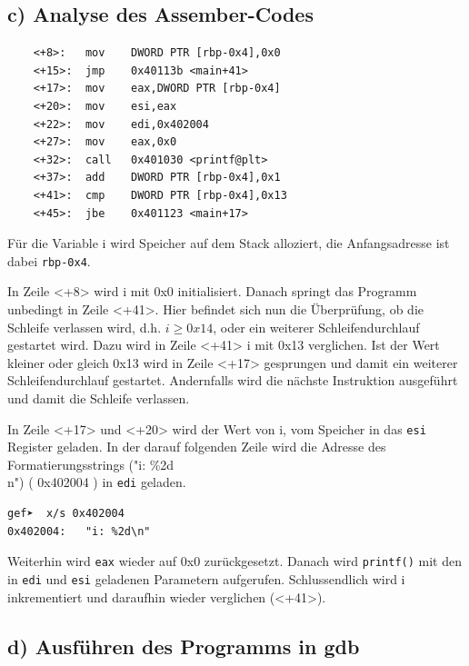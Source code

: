 \documentclass[12pt]{article}
\begin{document}
\subsection{c) Analyse des Assember-Codes}
\begin{lstlisting}
	<+8>:	mov    DWORD PTR [rbp-0x4],0x0
    <+15>:	jmp    0x40113b <main+41>
    <+17>:	mov    eax,DWORD PTR [rbp-0x4]
    <+20>:	mov    esi,eax
    <+22>:	mov    edi,0x402004
    <+27>:	mov    eax,0x0
    <+32>:	call   0x401030 <printf@plt>
    <+37>:	add    DWORD PTR [rbp-0x4],0x1
    <+41>:	cmp    DWORD PTR [rbp-0x4],0x13
    <+45>:	jbe    0x401123 <main+17>
\end{lstlisting}

Für die Variable i wird Speicher auf dem Stack alloziert, die Anfangsadresse ist dabei \texttt{rbp-0x4}.

In Zeile <+8> wird i mit 0x0 initialisiert. Danach springt das Programm unbedingt in Zeile <+41>. Hier befindet sich nun die Überprüfung, ob die Schleife verlassen wird, d.h. $ i \ge 0x14 $, oder ein weiterer Schleifendurchlauf gestartet wird. Dazu wird in Zeile <+41> i mit 0x13 verglichen. Ist der Wert kleiner oder gleich 0x13 wird in Zeile <+17> gesprungen und damit ein weiterer Schleifendurchlauf gestartet. Andernfalls wird die nächste Instruktion ausgeführt und damit die Schleife verlassen.

In Zeile <+17> und <+20> wird der Wert von i, vom Speicher in das \texttt{esi} Register geladen. In der darauf folgenden Zeile wird die Adresse des Formatierungsstrings ("i: \%2d\\n") ( 0x402004 ) in \texttt{edi} geladen.

\begin{lstlisting}
gef➤  x/s 0x402004
0x402004:	"i: %2d\n"
\end{lstlisting}

Weiterhin wird \texttt{eax} wieder auf 0x0 zurückgesetzt. Danach wird \texttt{printf()} mit den in \texttt{edi} und \texttt{esi} geladenen Parametern aufgerufen. Schlussendlich wird i inkrementiert und daraufhin wieder verglichen (<+41>).

\subsection{d) Ausführen des Programms in gdb}

\newcommand{\imageseriesExcercise}[3]{
\begin{center}
   \texttt{[image: Pictures/a\#1\#2\_\#3.png]}
	\captionof{figure}{#3. Ausgabe von gdb-uebung-#1.c}
\end{center}
}
\end{document}
